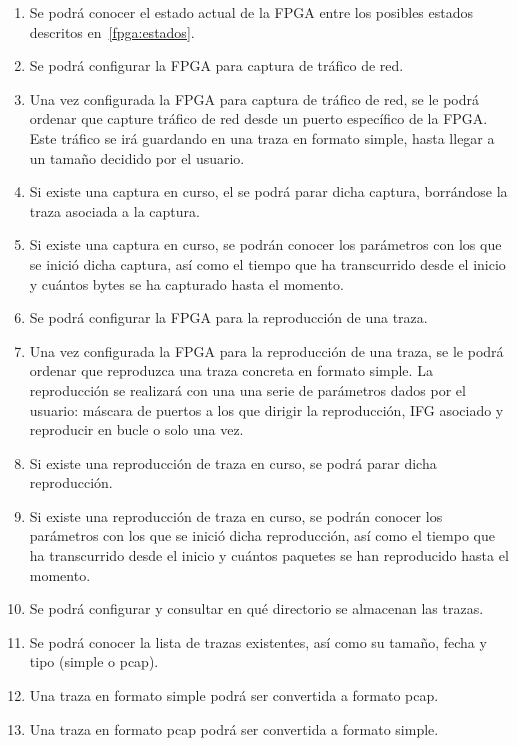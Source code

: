 \begin{enumerate}[align=left,before=\itshape,font=\normalfont,label=\bfseries RF. \arabic*]
  \item Se podrá conocer el estado actual de la \gls{FPGA} entre los posibles estados descritos en~\ref{fpga:estados}.
  \item Se podrá configurar la \gls{FPGA} para captura de tráfico de red.
  \item Una vez configurada la \gls{FPGA} para captura de tráfico de red, se le podrá ordenar que capture tráfico de red desde un puerto específico de la \gls{FPGA}.
  Este tráfico se irá guardando en una \gls{traza} en formato \gls{simple}, hasta llegar a un tamaño decidido por el usuario.
  \item Si existe una captura en curso, el se podrá parar dicha captura, borrándose la \gls{traza} asociada a la captura.
  \item Si existe una captura en curso, se podrán conocer los parámetros con los que se inició dicha captura, así como el tiempo que ha transcurrido desde el inicio y cuántos bytes se ha capturado hasta el momento.
  \item Se podrá configurar la \gls{FPGA} para la reproducción de una \gls{traza}.
  \item Una vez configurada la \gls{FPGA} para la reproducción de una \gls{traza}, se le podrá ordenar que reproduzca una \gls{traza} concreta en formato \gls{simple}.
  La reproducción se realizará con una una serie de parámetros dados por el usuario: máscara de puertos a los que dirigir la reproducción, \gls{IFG} asociado y reproducir en bucle o solo una vez.
  \item Si existe una reproducción de \gls{traza} en curso, se podrá parar dicha reproducción.
  \item Si existe una reproducción de \gls{traza} en curso, se podrán conocer los parámetros con los que se inició dicha reproducción, así como el tiempo que ha transcurrido desde el inicio y cuántos paquetes se han reproducido hasta el momento.
  \item Se podrá configurar y consultar en qué directorio se almacenan las \glspl{traza}.
  \item Se podrá conocer la lista de \glspl{traza} existentes, así como su tamaño, fecha y tipo (\gls{simple} o \gls{pcap}).
  \item Una traza en formato \gls{simple} podrá ser convertida a formato \gls{pcap}.
  \item Una traza en formato \gls{pcap} podrá ser convertida a formato \gls{simple}.

\end{enumerate}
